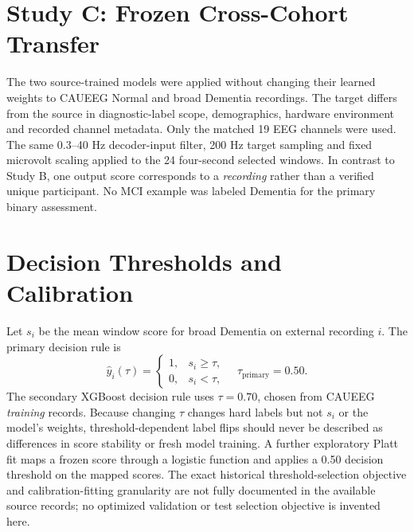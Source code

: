 \section{Study C: Frozen Cross-Cohort Transfer}
The two source-trained models were applied without changing their learned weights to CAUEEG Normal and broad Dementia recordings. The target differs from the source in diagnostic-label scope, demographics, hardware environment and recorded channel metadata. Only the matched 19 EEG channels were used. The same 0.3--40 Hz decoder-input filter, 200 Hz target sampling and fixed microvolt scaling applied to the 24 four-second selected windows. In contrast to Study B, one output score corresponds to a \emph{recording} rather than a verified unique participant. No MCI example was labeled Dementia for the primary binary assessment.


\section{Decision Thresholds and Calibration}
Let $s_i$ be the mean window score for broad Dementia on external recording $i$. The primary decision rule is
\begin{equation}
\hat y_i(\tau)=\begin{cases}1,&s_i\geq\tau,\\0,&s_i<\tau,\end{cases}\quad\tau_{\mathrm{primary}}=0.50.
\label{eq:threshold}
\end{equation}
The secondary XGBoost decision rule uses $\tau=0.70$, chosen from CAUEEG \emph{training} records. Because changing $\tau$ changes hard labels but not $s_i$ or the model's weights, threshold-dependent label flips should never be described as differences in score stability or fresh model training. A further exploratory Platt fit maps a frozen score through a logistic function and applies a 0.50 decision threshold on the mapped scores. The exact historical threshold-selection objective and calibration-fitting granularity are not fully documented in the available source records; no optimized validation or test selection objective is invented here.

